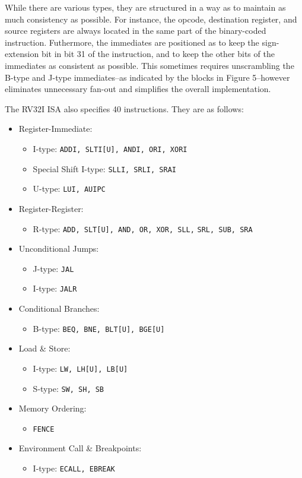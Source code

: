\documentclass[lettersize,journal]{IEEEtran}
\begin{document}
While there are various types, they are structured in a way as to maintain as much consistency as possible.
For instance, the opcode, destination register, and source registers are always located in the same part of the binary-coded instruction.
Futhermore, the immediates are positioned as to keep the sign-extension bit in bit 31 of the instruction, and to keep the other bits of the immediates as consistent as possible.
This sometimes requires unscrambling the B-type and J-type immediates--as indicated by the blocks in Figure 5--however eliminates unnecessary fan-out \cite{riscvunprovisioned} and simplifies the overall implementation.

The RV32I ISA also specifies 40 instructions.
They are as follows:
\begin{itemize}
  \item Register-Immediate:
  \begin{itemize}
    \item I-type: \verb|ADDI, SLTI[U], ANDI, ORI, XORI|
    \item Special Shift I-type: \verb|SLLI, SRLI, SRAI|
    \item U-type: \verb|LUI, AUIPC|
  \end{itemize}
  \item Register-Register:
  \begin{itemize}
    \item R-type: \verb|ADD, SLT[U], AND, OR, XOR, SLL,|
     \verb|SRL, SUB, SRA|
  \end{itemize}
  \item Unconditional Jumps:
  \begin{itemize}
    \item J-type: \verb|JAL|
    \item I-type: \verb|JALR|
  \end{itemize}
  \item Conditional Branches:
  \begin{itemize}
    \item B-type: \verb|BEQ, BNE, BLT[U], BGE[U]|
  \end{itemize}
  \item Load \& Store:
  \begin{itemize}
    \item I-type: \verb|LW, LH[U], LB[U]|
    \item S-type: \verb|SW, SH, SB|
  \end{itemize}
  \item Memory Ordering:
  \begin{itemize}
    \item \verb|FENCE|
  \end{itemize}
  \item Environment Call \& Breakpoints:
  \begin{itemize}
    \item I-type: \verb|ECALL, EBREAK|
  \end{itemize}
\end{itemize}
\end{document}
